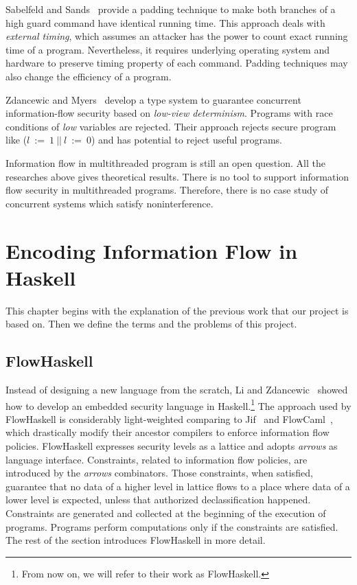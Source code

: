 \documentclass{report}
\begin{document}
Sabelfeld and Sands~\cite{Sabelfeld:Sands:CSFW00} provide a padding
technique to make both branches of a high guard command have identical
running time. This approach deals with {\em external timing}, which 
assumes an attacker has the power to count exact running time of a 
program. Nevertheless, it requires underlying operating system 
and hardware to preserve timing property of each command. Padding techniques
may also change the efficiency of a program.

Zdancewic and Myers~\cite{Zdancewic:Myers:CSFW03} develop a type system to
guarantee concurrent information-flow security based 
on {\em low-view determinism}.
Programs with race conditions of {\it low} variables are rejected.
Their approach rejects secure program like ($l~:=~1~||~l~:=~0$) and
has potential to reject useful programs.

Information flow in multithreaded program is still an open question.
All the researches above gives theoretical results.
There is no tool to support information flow security in multithreaded
programs. Therefore, there is no case study of concurrent systems which 
satisfy noninterference.


\chapter{Encoding Information Flow in Haskell}

This chapter begins with the explanation of the previous work that our project
is based on.
Then we define the terms and the problems of this project.

\section{FlowHaskell}
Instead of designing a new language from the scratch, Li and 
Zdancewic~\cite{Li:Zdancewic:CSFW} showed how to develop an embedded security language 
in Haskell.\footnote{From now on, we will refer to their work as FlowHaskell.} 
The approach used by FlowHaskell is considerably light-weighted 
comparing to Jif~\cite{jif} and FlowCaml~\cite{FlowCaml}, which drastically modify their ancestor 
compilers to enforce information flow policies. 
FlowHaskell expresses security levels as a lattice and adopts {\em arrows} as language interface. 
Constraints, related to information flow policies, are introduced by the {\em arrows} combinators. 
Those constraints, when satisfied, guarantee that no data of a higher level in lattice flows 
to a place where data of a lower level is expected, unless that authorized declassification happened.
Constraints are generated and collected at the beginning of the execution of programs. 
Programs perform computations only if the constraints are satisfied.
The rest of the section introduces FlowHaskell in more detail.
\end{document}
